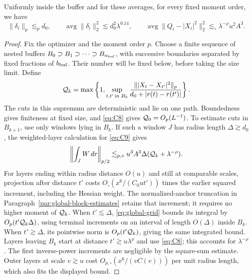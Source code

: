 \begin{lemma}\label{bud:box-moments}
Uniformly inside the buffer and for these averages, for every fixed
moment order, we have
\[
 \|\delta_i\|_p\lesssim_p d_0,\qquad
 \operatorname{avg}\|\delta_i\|_2^2\lesssim d_0^2\lambda^{0.14},\qquad
 \operatorname{avg}\|Q_i-|X_i|^2\|_2^2
                         \lesssim_\circ \lambda^{-\rho}u^2 A^3.          \tag{C15}\label{eq:C15}
\]

\end{lemma}\begin{proof}


Fix the optimizer and the moment order \(p\). Choose a finite sequence
of nested buffers \(B_0\supset B_1\supset\cdots\supset B_{n_{\rm buf}}\),
with successive boundaries separated by fixed fractions of
\(b_{\rm buf}\). Their number will be fixed below, before taking the
size limit. Define
\[
 {\cal Q}_k=\max\left\{1,\sup_{t,t'\,\text{in }B_k}
  \frac{\||X_t-X_{t'}|^2\|_p}
       {d_0+|r(t)-r(t')|}\right\}.
\]
The cuts in this supremum are deterministic and lie on one path.
Boundedness gives finiteness at fixed size, and \eqref{eq:C8} gives
\({\cal Q}_0=O_p(L^{-1})\). To estimate cuts in \(B_{k+1}\),
use only windows lying in \(B_k\). If such a window \(J\) has
radius length \(\Delta\gtrsim d_0\), the weighted-layer calculation
for \eqref{eq:C9} gives
\[
 \left\|\int_J W\,dr\right\|_{p/2}
 \lesssim_{p,\circ} u^3 A^3\Delta({\cal Q}_k+\lambda^{-\rho}).
\]
For layers ending within radius distance \(O(u)\) and still at
comparable scales, projection after distance \(t'\) costs
\(O_\circ(x^6/(C_0ut'))\) times the earlier squared increment,
including the Hessian weight. The normalized-anchor truncation in
Paragraph~\ref{par:global-block-estimates} retains that increment;
it requires no higher moment of \({\cal Q}_k\). When
\(t'\lesssim\Delta\), \eqref{eq:global-grid} bounds its integral by
\(O_p(t'{\cal Q}_k\Delta)\), using terminal increments on an
interval of length \(O(\Delta)\) inside \(B_k\). When
\(t'\gtrsim\Delta\), its pointwise norm is
\(O_p(t'{\cal Q}_k)\), giving the same integrated bound.
Layers leaving \(B_k\) start at distance
\(t'\gtrsim u\lambda^\rho\) and use \eqref{eq:C8}; this accounts
for \(\lambda^{-\rho}\). The first inverse-power increments are
negligible by the square-sum estimate. Outer layers at scale
\(v\gtrsim u\) cost \(O_{p,\circ}(x^6/(vC(v)))\) per unit
radius length, which also fits the displayed bound.


\end{proof}
